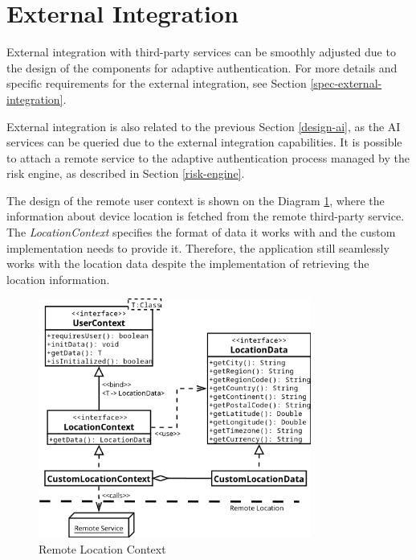 \section{External Integration} \label{design-external-integration}
External integration with third-party services can be smoothly adjusted due to the design of the components for adaptive authentication.
For more details and specific requirements for the external integration, see Section \ref{spec-external-integration}.

External integration is also related to the previous Section \ref{design-ai}, as the AI services can be queried due to the external integration capabilities.
It is possible to attach a remote service to the adaptive authentication process managed by the risk engine, as described in Section \ref{risk-engine}.

The design of the remote user context is shown on the Diagram \ref{fig:design-external-integration}, where the information about device location is fetched from the remote third-party service. 
The \textit{LocationContext} specifies the format of data it works with and the custom implementation needs to provide it.
Therefore, the application still seamlessly works with the location data despite the implementation of retrieving the location information.

\begin{figure}[htbp]
  \centering
  \includegraphics[width=0.8\textwidth]{img/sections/5-design/location-diagram.png}
  \caption{Remote Location Context}
  \label{fig:design-external-integration}
\end{figure}

\newpage